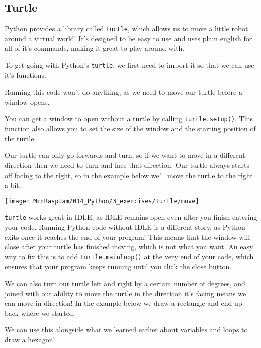 	\subsection{Turtle}

		Python provides a library called \texttt{turtle}, which allows us to move a little robot around a virtual world! It's designed to be easy to use and uses plain english for all of it's commands, making it great to play around with.

		To get going with Python's \texttt{turtle}, we first need to import it so that we can use it's functions.

		

		Running this code won't do anything, as we need to move our turtle before a window opens.

		\begin{aside}
			You can get a window to open without a turtle by calling \texttt{turtle.setup()}. This function also allows you to set the size of the window and the starting position of the turtle.
		\end{aside}

		Our turtle can only go forwards and turn, so if we want to move in a different direction then we need to turn and face that direction. Our turtle always starts off facing to the right, so in the example below we'll move the turtle to the right a bit.

		

		\begin{center}
			\texttt{[image: McrRaspJam/014\_Python/3\_exercises/turtle/move]}
		\end{center}

		\begin{aside}
			\texttt{turtle} works great in IDLE, as IDLE remains open even after you finish entering your code. Running Python code without IDLE is a different story, as Python exits once it reaches the end of your program! This means that the window will close after your turtle has finished moving, which is not what you want. An easy way to fix this is to add \texttt{turtle.mainloop()} at the very end of your code, which ensures that your program keeps running until you click the close button.
		\end{aside}

		\webclearpage

		We can also turn our turtle left and right by a certain number of degrees, and joined with our ability to move the turtle in the direction it's facing means we can move in direction! In the example below we draw a rectangle and end up back where we started.

		

		We can use this alongside what we learned earlier about variables and loops to draw a hexagon!

		
